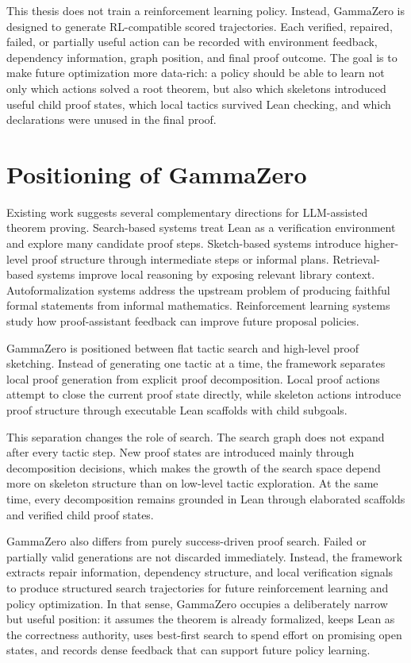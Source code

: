 \documentclass[en]{uet_awesome_thesis/uet-awesome-thesis}
\begin{document}
This thesis does not train a reinforcement learning policy. Instead, GammaZero is designed to generate RL-compatible scored
trajectories. Each verified, repaired, failed, or partially useful action can be recorded with environment
feedback, dependency information, graph position, and final proof outcome. The goal is to make future
optimization more data-rich: a policy should be able to learn not only which actions solved a root theorem,
but also which skeletons introduced useful child proof states, which local tactics survived Lean checking,
and which declarations were unused in the final proof.

\section{Positioning of GammaZero}

Existing work suggests several complementary directions for LLM-assisted theorem proving. Search-based
systems treat Lean as a verification environment and explore many candidate proof steps. Sketch-based
systems introduce higher-level proof structure through intermediate steps or informal plans.
Retrieval-based systems improve local reasoning by exposing relevant library context. Autoformalization
systems address the upstream problem of producing faithful formal statements from informal mathematics.
Reinforcement learning systems study how proof-assistant feedback can improve future proposal policies.

GammaZero is positioned between flat tactic search and high-level proof sketching. Instead of generating one tactic at a time, the framework separates local proof generation from explicit proof decomposition. Local proof actions attempt to close the current proof state directly, while skeleton actions introduce proof structure through executable Lean scaffolds with child subgoals.

This separation changes the role of search. The search graph does not expand after every tactic step. New proof states are introduced mainly through decomposition decisions, which makes the growth of the search space depend more on skeleton structure than on low-level tactic exploration. At the same time, every decomposition remains grounded in Lean through elaborated scaffolds and verified child proof states.

GammaZero also differs from purely success-driven proof search. Failed or partially valid generations are not discarded immediately. Instead, the framework extracts repair information, dependency structure, and local verification signals to produce structured search trajectories for future reinforcement learning and policy optimization. In that sense, GammaZero occupies a deliberately narrow but useful position: it assumes the theorem is already formalized, keeps Lean as the correctness authority, uses best-first search to spend effort on promising open states, and records dense feedback that can support future policy learning.
\end{document}
